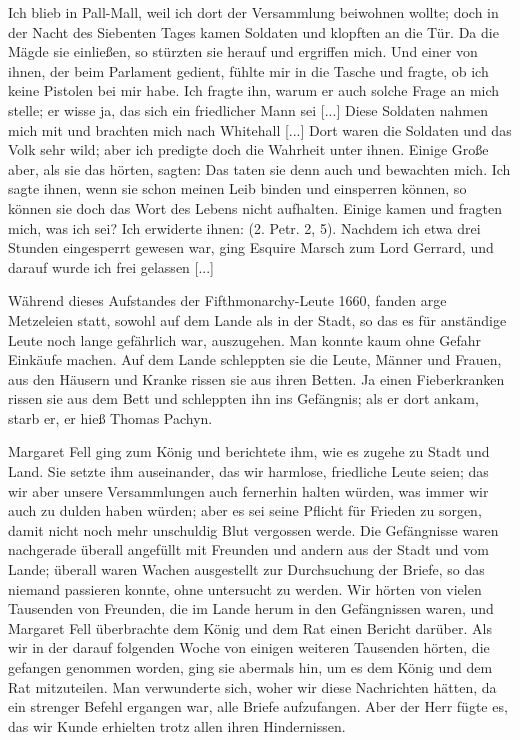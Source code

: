 Ich blieb in Pall-Mall, weil ich dort der Versammlung beiwohnen 
wollte; doch in der Nacht des Siebenten Tages kamen
Soldaten und klopften an die Tür. Da die Mägde sie einließen,
so stürzten sie herauf und ergriffen mich. Und einer von ihnen,
der beim Parlament gedient, fühlte mir in die Tasche und fragte,
ob ich keine Pistolen bei mir habe. Ich fragte ihn, warum er
auch solche Frage an mich stelle; er wisse ja, das sich ein 
friedlicher Mann sei [...] Diese Soldaten nahmen mich mit und
brachten mich nach Whitehall [...] Dort waren die Soldaten
und das Volk sehr wild; aber ich predigte doch die Wahrheit
unter ihnen. Einige Große aber, als sie das hörten, sagten:
 Das taten sie denn auch
und bewachten mich. Ich sagte ihnen, wenn sie schon meinen
Leib binden und einsperren können, so können sie doch das Wort
des Lebens nicht aufhalten. Einige kamen und fragten mich,
was ich sei? Ich erwiderte ihnen:  (2. Petr. 2, 5). 
Nachdem ich etwa drei 
Stunden eingesperrt gewesen war, ging Esquire Marsch zum Lord 
Gerrard, und darauf wurde ich frei gelassen [...]

Während dieses Aufstandes der Fifthmonarchy-Leute 
1660,
fanden arge Metzeleien statt, sowohl auf dem Lande als in der
Stadt, so das es für anständige Leute noch lange gefährlich war,
auszugehen. Man konnte kaum ohne Gefahr Einkäufe machen.
Auf dem Lande schleppten sie die Leute, Männer und Frauen,
aus den Häusern und Kranke rissen sie aus ihren Betten. Ja
einen Fieberkranken rissen sie aus dem Bett und schleppten ihn
ins Gefängnis; als er dort ankam, starb er, er hieß Thomas
Pachyn.

Margaret Fell ging zum König und berichtete ihm, wie es
zugehe zu Stadt und Land. Sie setzte ihm auseinander, das wir
harmlose, friedliche Leute seien; das wir aber unsere Versammlungen 
auch fernerhin halten würden, was immer wir auch zu
dulden haben würden; aber es sei seine Pflicht für Frieden zu
sorgen, damit nicht noch mehr unschuldig Blut vergossen werde.
Die Gefängnisse waren nachgerade überall angefüllt mit
Freunden und andern aus der Stadt und vom Lande; überall
waren Wachen ausgestellt zur Durchsuchung der Briefe, so das
niemand passieren konnte, ohne untersucht zu werden. Wir hörten
von vielen Tausenden von Freunden, die im Lande herum in den
Gefängnissen waren, und Margaret Fell überbrachte dem König
und dem Rat einen Bericht darüber. Als wir in der darauf 
folgenden Woche von einigen weiteren Tausenden hörten, die 
gefangen genommen worden, ging sie abermals hin, um es dem König
und dem Rat mitzuteilen. Man verwunderte sich, woher wir
diese Nachrichten hätten, da ein strenger Befehl ergangen war,
alle Briefe aufzufangen. Aber der Herr fügte es, das wir Kunde
erhielten trotz allen ihren Hindernissen.

